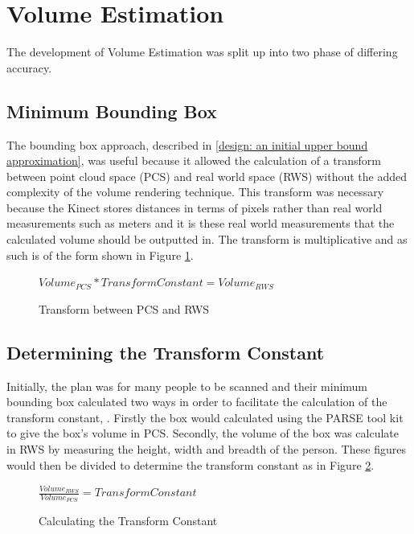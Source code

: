 \section{Volume Estimation}
\label{volume estimation}
The development of Volume Estimation was split up into two phase of differing accuracy.
\subsection{Minimum Bounding Box}
\label{testing: minimum bounding box}
The bounding box approach, described in \ref{design: an initial upper bound approximation}, was useful because it allowed the calculation of a transform between point cloud space (PCS) and real world space (RWS) without the added complexity of the volume rendering technique. This transform was necessary because the Kinect stores distances in terms of pixels rather than real world measurements such as meters and it is these real world measurements that the calculated volume should be outputted in. The transform is multiplicative and as such is of the form shown in Figure \ref{testing: transform between pcs and rws}.\\

\begin{figure}[h]
\begin{center}
$Volume_{PCS} * Transform Constant = Volume_{RWS}$
\end{center}
\caption{Transform between PCS and RWS}
\label{testing: transform between pcs and rws}
\end{figure}

\subsection{Determining the Transform Constant}
\label{determining the transform constant}
Initially, the plan was for many people to be scanned and their minimum bounding box calculated two ways in order to facilitate the calculation of the transform constant, . Firstly the box would calculated using the PARSE tool kit to give the box's volume in PCS. Secondly, the volume of the box was calculate in RWS by measuring the height, width and breadth of the person. These figures would then be divided to determine the transform constant as in Figure \ref{testing: calculating the transform constant}.\\

\begin{figure}[h]
\begin{center}
$\frac{Volume_{RWS}}{Volume_{PCS}} = Transform Constant$
\end{center}
\caption{Calculating the Transform Constant}
\label{testing: calculating the transform constant}
\end{figure}

